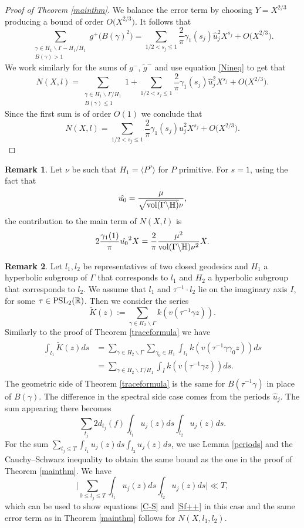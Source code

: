 \documentclass[a4paper,11pt]{amsart}
\theoremstyle{definition}
\newtheorem{remark}{Remark}
\begin{document}
\begin{proof}[Proof of Theorem \ref{mainthm}]
We balance the error term by choosing $Y=X^{2/3}$ producing a bound of order $O\big(X^{2/3}\big).$ It follows that
$$\sum_{\substack{{\gamma \in H_1 \backslash \Gamma -H_1 /H_1} \\ B(\gamma)>1 }}g^{+}\big(B(\gamma)^2\big)=\sum_{1/2<s_j\le1}\frac{2}{\pi}\gamma_1(s_j)\hat{u}_j^2X^{s_j}+O\big(X^{2/3}\big).$$
We work similarly for the sums of $g^{-}$, $\widetilde{g}^{-}$ and use equation \eqref{Nineq} to get that
$$N(X,l)=\sum_{\substack{{\gamma \in H_1 \backslash \Gamma /H_1} \\ B(\gamma) \leq 1 }}1+\sum_{1/2<s_j\le1}\frac{2}{\pi}\gamma_1(s_j)\hat{u}_j^2X^{s_j}+O\big(X^{2/3}\big).$$
Since the first sum is of order $O(1)$ we conclude that
$$N(X,l)=\sum_{1/2<s_j\le1}\frac{2}{\pi}\gamma_1(s_j)\hat{u}_j^2X^{s_j}+O\big(X^{2/3}\big).$$
\end{proof}

\begin{remark}
Let $\nu$ be such that $H_1=\langle P^\nu \rangle$ for $P$ primitive. For $s=1$, using the fact that 
$$\hat{u_0}= \frac{\mu}{\sqrt{\hbox{vol}(\Gamma \backslash \mathbb{H})}\nu},$$
the contribution to the main term of $N(X,l)$ is $$2\frac{\gamma_1(1)}{\pi}\hat{u_0}^2X=\frac{2}{\pi} \frac{\mu^2}{\hbox{vol}(\Gamma \backslash \mathbb{H})\nu^2}X.$$
\end{remark}
\begin{remark}\label{Rem}
Let $l_1,l_2$ be representatives of two closed geodesics and $H_1$ a hyperbolic subgroup of $\Gamma$ that corresponds to $l_1$ and $H_2$ a hyperbolic subgroup that corresponds to $l_2$. We assume that $l_1$ and $\tau^{-1} \cdot l_2$ lie on the imaginary axis $I$, for some $\tau \in \hbox{PSL}_2(\mathbb{R})$. 
Then we consider the series
$$\widetilde{K}(z):= \sum_{\gamma \in H_2 \backslash \Gamma} k(v(\tau^{-1}\gamma z)).$$ 
Similarly to the proof of Theorem \ref{traceformula} we have
\begin{align}
    \begin{split}
        \int_{l_1} \widetilde{K}(z)ds &= \sum_{\gamma \in H_2\backslash \Gamma} \sum_{\gamma_0 \in H_1} \int_{l_1}k(v(\tau^{-1}\gamma \gamma_0 z))ds \\
        &=\sum_{\gamma \in H_2\backslash \Gamma /H_1}  \int_Ik(v(\tau^{-1}\gamma z))ds.
    \end{split}
\end{align}
The geometric side of Theorem \ref{traceformula} is the same for $B(\tau^{-1}\gamma)$ in place of $B(\gamma)$.
The difference in the spectral side case comes from the periods $\hat{u}_j$. The sum appearing there becomes
$$\sum_{t_j}2d_{t_j}(f)\int_{l_1}u_j(z)ds \int_{l_2}u_j(z)ds.$$
For the sum $\sum_{t_j\le T}\int_{l_1}u_j(z)ds\int_{l_2}u_j(z)ds$, we use Lemma \ref{periods} and the Cauchy--Schwarz inequality to obtain the same bound as the one in the proof of Theorem \ref{mainthm}. We have
$$\Bigg|\sum_{0\le t_j \le T}\int_{l_1}u_j(z)ds\int_{l_2}u_j(z)ds\Bigg| \ll T,$$
which can be used to show equations \eqref{C-S} and \eqref{Sf++} in this case and the same error term as in Theorem \ref{mainthm} follows for $N(X,l_1,l_2)$.
\end{remark}
\end{document}
